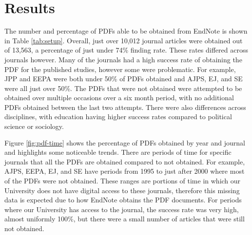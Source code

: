 \documentclass[
  english,
  ,man]{apa6}
\begin{document}
\hypertarget{results}{%
\section{Results}\label{results}}

The number and percentage of PDFs able to be obtained from EndNote is shown in Table \ref{tab:setup}. Overall, just over 10,012 journal articles were obtained out of 13,563, a percentage of just under 74\% finding rate. These rates differed across journals however. Many of the journals had a high success rate of obtaining the PDF for the published studies, however some were problematic. For example, JPP and EEPA were both under 50\% of PDFs obtained and AJPS, EJ, and SE were all just over 50\%. The PDFs that were not obtained were attempted to be obtained over multiple occasions over a six month period, with no additional PDFs obtained between the last two attempts. There were also differences across disciplines, with education having higher success rates compared to political science or sociology.

Figure \ref{fig:pdf-time} shows the percentage of PDFs obtained by year and journal and highlights some noticeable trends. There are periods of time for specific journals that all the PDFs are obtained compared to not obtained. For example, AJPS, EEPA, EJ, and SE have periods from 1995 to just after 2000 where most of the PDFs were not obtained. These ranges are portions of time in which our University does not have digital access to these journals, therefore this missing data is expected due to how EndNote obtains the PDF documents. For periods where our University has access to the journal, the success rate was very high, almost uniformly 100\%, but there were a small number of articles that were still not obtained.
\end{document}
